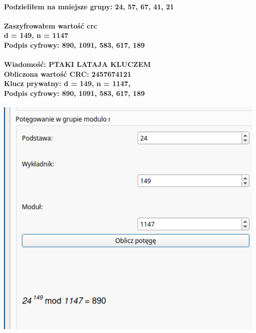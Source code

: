 \documentclass{article}[12pt]
\begin{document}
\paragraph{Podzieliłem na mniejsze grupy: 24, 57, 67, 41, 21}
\paragraph{Zaszyfrowałem wartość crc \\ d = 149, n = 1147 \\ Podpis cyfrowy: 890, 1091, 583, 617, 189 \\}
\paragraph{Wiadomość: PTAKI LATAJA KLUCZEM \\ Obliczona wartość CRC: 2457674121 \\ Klucz prywatny: d = 149, n = 1147, \\ Podpis cyfrowy: 890, 1091, 583, 617, 189}
\includegraphics[width=1\textwidth]{twenty.png} 
\end{document}
